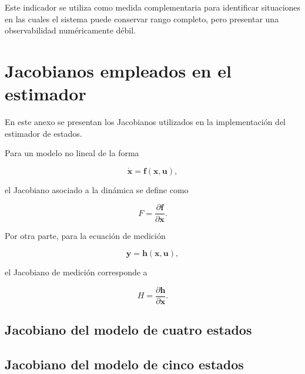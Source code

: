 Este indicador se utiliza como medida complementaria para identificar
situaciones en las cuales el sistema puede conservar rango completo,
pero presentar una observabilidad numéricamente débil.

\clearpage



\chapter{Jacobianos empleados en el estimador}
\label{anexo:jacobianos}

En este anexo se presentan los Jacobianos utilizados en la
implementación del estimador de estados.

Para un modelo no lineal de la forma

\begin{equation}
    \dot{\mathbf{x}}
    =
    \mathbf{f}(\mathbf{x},\mathbf{u}),
\end{equation}

el Jacobiano asociado a la dinámica se define como

\begin{equation}
    F =
    \frac{\partial \mathbf{f}}
         {\partial \mathbf{x}}.
\end{equation}

Por otra parte, para la ecuación de medición

\begin{equation}
    \mathbf{y}
    =
    \mathbf{h}(\mathbf{x},\mathbf{u}),
\end{equation}

el Jacobiano de medición corresponde a

\begin{equation}
    H =
    \frac{\partial \mathbf{h}}
         {\partial \mathbf{x}}.
\end{equation}


\section{Jacobiano del modelo de cuatro estados}
\label{anexo:jacobiano_4}



\section{Jacobiano del modelo de cinco estados}
\label{anexo:jacobiano_5}

